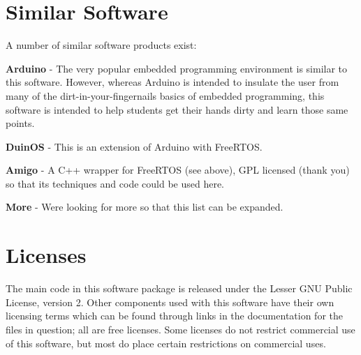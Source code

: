 \hypertarget{index_m_sim}{}\section{Similar Software}\label{index_m_sim}
A number of similar software products exist\+: \begin{DoxyItemize}
\item {\bfseries Arduino} -\/ The very popular embedded programming environment is similar to this software. However, whereas Arduino is intended to insulate the user from many of the dirt-\/in-\/your-\/fingernails basics of embedded programming, this software is intended to help students get their hands dirty and learn those same points. \item {\bfseries Duin\+OS} -\/ This is an extension of Arduino with Free\+R\+T\+OS. \item {\bfseries Amigo} -\/ A C++ wrapper for Free\+R\+T\+OS (see above), G\+PL licensed (thank you) so that its techniques and code could be used here. \item {\bfseries More} -\/ We\textquotesingle{}re looking for more so that this list can be expanded.\end{DoxyItemize}
\hypertarget{index_m_lic}{}\section{Licenses}\label{index_m_lic}
The main code in this software package is released under the Lesser G\+NU Public License, version 2. Other components used with this software have their own licensing terms which can be found through links in the documentation for the files in question; all are free licenses. Some licenses do not restrict commercial use of this software, but most do place certain restrictions on commercial uses. 
